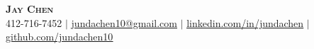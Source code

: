 \begin{center}
    \textbf{\Huge \scshape Jay Chen} \\ \vspace{1pt}
    \small 412-716-7452 $|$ \href{mailto:x@x.com}{\underline{jundachen10@gmail.com}} $|$ 
    \href{https://linkedin.com/in/jundachen}{\underline{linkedin.com/in/jundachen}} $|$
    \href{https://github.com/jundachen10}{\underline{github.com/jundachen10}}
\end{center}